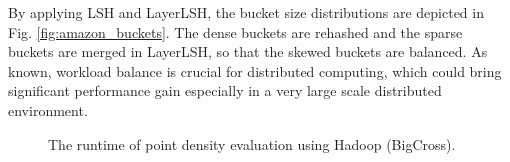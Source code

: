 By applying LSH and LayerLSH, the bucket size distributions are depicted in Fig. \ref{fig:amazon_buckets}. The dense buckets are rehashed and the sparse buckets are merged in LayerLSH, so that the skewed buckets are balanced. As known, workload balance is crucial for distributed computing, which could bring significant performance gain especially in a very large scale distributed environment.

\begin{figure}[t]
	\centerline{
    \hspace{-5mm}
    }
	\caption{The runtime of point density evaluation using Hadoop (BigCross).}
	\label{fig:amazon}
\end{figure}

